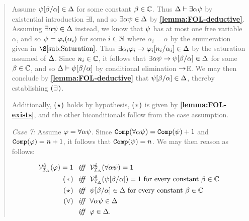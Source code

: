 \begin{quote}
  Assume $\psi[\beta/\alpha]\in\Delta$ for some constant $\beta\in\mathbb{C}$.
  Thus $\Delta\vdash \exists \alpha\psi$ by existential introduction $\exists$I, and so $\exists \alpha\psi\in\Delta$ by \textbf{\ref{lemma:FOL-deductive}}.
  Assuming $\exists \alpha\psi\in\Delta$ instead, we know that $\psi$ has at most one free variable $\alpha$, and so $\psi=\varphi_i(\alpha_i)$ for some $i\in\mathbb{N}$ where $\alpha_i=\alpha$ by the enumeration given in $\S\ref{sub:Saturation}$.
  Thus $\exists \alpha_i\varphi_i\rightarrow \varphi_i[n_i/\alpha_i]\in\Delta$ by the saturation assumed of $\Delta$.
  Since $n_i\in\mathbb{C}$, it follows that $\exists \alpha\psi\rightarrow\psi[\beta/\alpha]\in\Delta$ for some $\beta\in\mathbb{C}$, and so $\Delta\vdash\psi[\beta/\alpha]$ by conditional elimination $\rightarrow$E. 
  We may then conclude by \textbf{\ref{lemma:FOL-deductive}} that $\psi[\beta/\alpha]\in\Delta$, thereby establishing $(\hspace{.7pt}\exists\hspace{.7pt})$.

  Additionally, $(\hspace{.7pt}\star\hspace{.7pt})$ holds by hypothesis, $(\hspace{.7pt}\ast\hspace{.7pt})$ is given by \textbf{\ref{lemma:FOL-exists}}, and the other biconditionals follow from the case assumption.

  \textit{Case 7:}
  Assume $\varphi=\forall \alpha\psi$.
  Since $\texttt{Comp}(\forall \alpha\psi)=\texttt{Comp}(\psi)+1$ and $\texttt{Comp}(\varphi)=n+1$, it follows that $\texttt{Comp}(\psi)=n$.
  We may then reason as follows:

  \vspace{-.2in}
  \begin{align*}
    \mathcal{V}_{\mathcal{I}_{\Delta}}^{\hat{a}}(\varphi)=1 &\textit{ ~iff~ } \mathcal{V}_{\mathcal{I}_{\Delta}}^{\hat{a}}(\forall \alpha\psi)=1\\
      (\hspace{1pt}\ast\hspace{1pt}) &\textit{ ~iff~ } \mathcal{V}_{\mathcal{I}_{\Delta}}^{\hat{a}}(\psi[\beta/\alpha])=1 \text{ for every constant } \beta\in\mathbb{C}\\
      (\hspace{.7pt}\star\hspace{.7pt}) &\textit{ ~iff~ } \psi[\beta/\alpha]\in\Delta \text{ for every constant } \beta\in\mathbb{C}\\ 
      (\hspace{.3pt}\forall\hspace{.3pt}) &\textit{ ~iff~ } \forall \alpha\psi\in\Delta \\
      &\textit{ ~iff~ } \varphi\in\Delta.
  \end{align*}


\end{quote}
